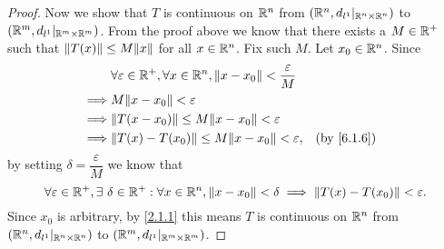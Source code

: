 \begin{proof}
  Now we show that \(T\) is continuous on \(\R^n\) from \((\R^n, d_{l^1}|_{\R^n \times \R^n})\) to \((\R^m, d_{l^1}|_{\R^m \times \R^m})\).
  From the proof above we know that there exists a \(M \in \R^+\) such that \(\norm*{T(x)} \leq M \norm*{x}\) for all \(x \in \R^n\).
  Fix such \(M\).
  Let \(x_0 \in \R^n\).
  Since
  \begin{align*}
             & \forall \varepsilon \in \R^+, \forall x \in \R^n, \norm*{x - x_0} < \dfrac{\varepsilon}{M}                 \\
    \implies & M \norm*{x - x_0} < \varepsilon                                                                            \\
    \implies & \norm*{T(x - x_0)} \leq M \norm*{x - x_0} < \varepsilon                                                    \\
    \implies & \norm*{T(x) - T(x_0)} \leq M \norm*{x - x_0} < \varepsilon,                                &  & \by{6.1.6}
  \end{align*}
  by setting \(\delta = \dfrac{\varepsilon}{M}\) we know that
  \[
    \forall \varepsilon \in \R^+, \exists\ \delta \in \R^+ : \forall x \in \R^n, \norm*{x - x_0} < \delta \implies \norm*{T(x) - T(x_0)} < \varepsilon.
  \]
  Since \(x_0\) is arbitrary, by \cref{2.1.1} this means \(T\) is continuous on \(\R^n\) from \((\R^n, d_{l^1}|_{\R^n \times \R^n})\) to \((\R^m, d_{l^1}|_{\R^m \times \R^m})\).
\end{proof}